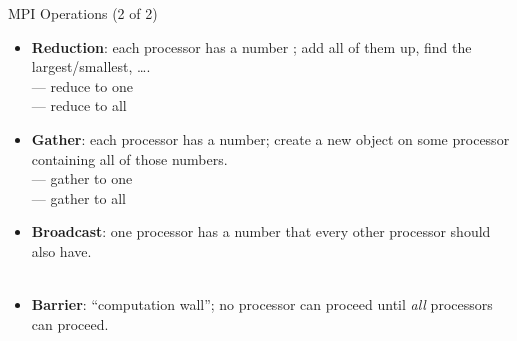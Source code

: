 \begin{frame}[shrink]
  \begin{block}{MPI Operations (2 of 2)}\pause
    \begin{itemize}
      \item \textbf{Reduction}:  each processor has a number ; add all of them up, find the largest/smallest, \dots .\\
       --- reduce to one\\
       --- reduce to all\\[.4cm]
      \item \textbf{Gather}: each processor has a number; create a new object on some processor containing all of those numbers.\\
       --- gather to one\\
       --- gather to all\\[.4cm]
      \item \textbf{Broadcast}: one processor has a number  that every other processor should also have.\\
      \\[.4cm]
      \item \textbf{Barrier}: ``computation wall''; no processor can proceed until \emph{all} processors can proceed.\\
    \end{itemize}
  \end{block}
\end{frame}



